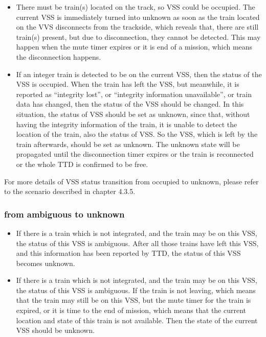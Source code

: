 \documentclass[article,dr=phil,type=msc,colorback,accentcolor=tud9c]{tudthesis}
\begin{document}
  \begin{itemize}
	
	\item 
	
	There must be train(s) located on the track, so VSS could be occupied. The current VSS is immediately turned into unknown as soon as the train located on the VVS disconnects from the trackside, which reveals that, there are still train(s) present, but due to disconnection, they cannot be detected. This may happen when the mute timer expires or it is end of a mission, which means the disconnection happens.
	
	\item 
	
	If an integer train is detected to be on the current VSS, then the status of the VSS is occupied. When the train has left the VSS, but meanwhile, it is reported as ``integrity lost'', or ``integrity information unavailable'', or train data has changed, then the status of the VSS should be changed. In this situation, the status of VSS should be set as unknown, since that, without having the integrity information of the train, it is unable to detect the location of the train, also the status of VSS. So the VSS, which is left by the train afterwards, should be set as unknown. The unknown state will be propagated until the disconnection timer expires or the train is reconnected or the whole TTD is confirmed to be free.
	
  \end{itemize}  

  For more details of VSS status transition from occupied to unknown, please refer to the scenario described in chapter 4.3.5.

  \subsubsection{from ambiguous to unknown}

  \begin{itemize}
	
	\item 
	
	If there is a train which is not integrated, and the train may be on this VSS, the status of this VSS is ambiguous. After all those trains have left this VSS, and this information has been reported by TTD, the status of this VSS becomes unknown.
	
	\item 
	
	If there is a train which is not integrated, and the train may be on this VSS, the status of this VSS is ambiguous. If the train is not leaving, which means that the train may still be on this VSS, but the mute timer for the train is expired, or it is time to the end of mission, which means that the current location and state of this train is not available. Then the state of the current VSS should be unknown.
	
  \end{itemize}  
\end{document}

